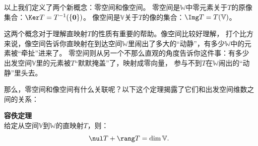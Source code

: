 \documentclass[12pt,UTF8]{ctexbook}
\begin{document}
以上我们定义了两个新概念：零空间和像空间。
零空间是$\mathbb{W}$中零元素关于$T$的原像集合：$\Ker T = T^{-1}(\{\mathbf{0}\})$。
像空间是$\mathbb{V}$关于$T$的像的集合：$\Img T = T(\mathbb{V})$。

这两个概念对于理解直映射$T$的性质有重要的帮助。像空间比较好理解，
打个比方来说，像空间告诉你直映射在到达空间$\mathbb{W}$里闹出了多大的“动静”，有多少$\mathbb{W}$中的元素被“牵扯”进来了。
零空间则从另一个不那么直观的角度告诉你这件事：有多少出发空间$\mathbb{V}$里的元素被$T$“默默掩盖”了，映射成零向量，
参与不到$T$在$\mathbb{W}$闹出的“动静”里头去。

那么，零空间和像空间有什么关联呢？以下这个定理揭露了它们和出发空间维数之间的关系：
\begin{pp}\textbf{容佚定理}\label{pp:3_3_1}\\
    给定从空间$\mathbb{V}$到$\mathbb{W}$的直映射$T$，则：
    $$ \nul T + \rang T = \dim \mathbb{V}. $$
\end{pp}
\end{document}
